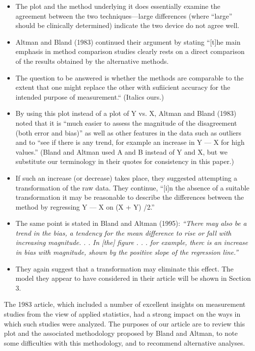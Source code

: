 \documentclass[]{article}
\begin{document}
\begin{itemize}
\item The plot and the method underlying it does essentially examine the agreement
between the two techniques—large differences (where “large” should be clinically
determined) indicate the two device do not agree well. 
\item Altman and Bland (1983)
continued their argument by stating “[t]he main emphasis in method comparison
studies clearly rests on a direct comparison of the results obtained by the alternative
methods. 
\item The question to be answered is whether the methods are comparable to
the extent that one might replace the other with suﬁicient accuracy for the intended
purpose of measurement.“ (Italics ours.)
\item 
By using this plot instead of a plot of Y vs. X, Altman and Bland (1983) noted
that it is “much easier to assess the magnitude of the disagreement (both error and
bias)” as well as other features in the data such as outliers and to “see if there is
any trend, for example an increase in Y — X for high values.” (Bland and Altman
used A and B instead of Y and X, but we substitute our terminology in their quotes
for consistency in this paper.) 
\item If such an increase (or decrease) takes place, they
suggested attempting a transformation of the raw data. They continue, “[i]n the
absence of a suitable transformation it may be reasonable to describe the differences
between the method by regressing Y — X on (X + Y) /2.” 
\item The same point is stated
in Bland and Altman (1995): \textit{“There may also be a trend in the bias, a tendency
for the mean difference to rise or fall with increasing magnitude. . . In [the] ﬁgure . . .
for example, therc is an increase in bias with magnitude, shown by the positive slope
of the regression line.”} 
\item They again suggest that a transformation may eliminate this
effect. The model they appear to have considered in their article will be shown in Section 3.
\end{itemize}




The 1983 article, which included a number of excellent insights on measurement
studies from the view of applied statistics, had a strong impact on the ways in which
such studies were analyzed. The purposes of our article are to review this plot and
the associated methodology proposed by Bland and Altman, to note some difficulties
with this methodology, and to recommend alternative analyses.
\newpage
\end{document}
